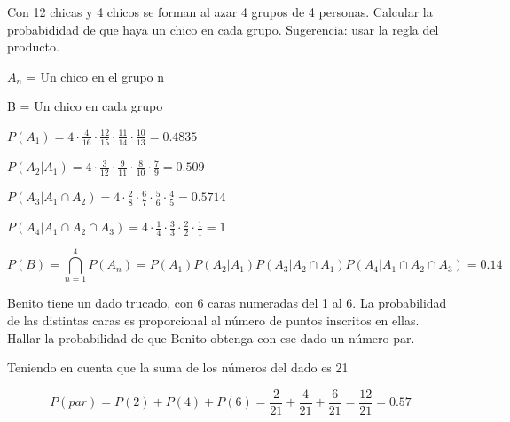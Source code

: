 \begin{problem}[6]Con 12 chicas y 4 chicos se forman al azar 4 grupos de 4 personas.
Calcular la probabididad de que haya un chico en cada grupo. Sugerencia:
usar la regla del producto.
 
\solution

\begin{expla}

$A_n$ = Un chico en el grupo n

B = Un chico en cada grupo
\end{expla}

$P(A_1)=4\cdot\frac{4}{16}\cdot\frac{12}{15}\cdot\frac{11}{14}\cdot\frac{10}{13}=0.4835$

$P(A_2|A_1)=4\cdot\frac{3}{12}\cdot\frac{9}{11}\cdot\frac{8}{10}\cdot\frac{7}{9}=0.509$

$P(A_3|A_1\cap A_2)=4\cdot\frac{2}{8}\cdot\frac{6}{7}\cdot\frac{5}{6}\cdot\frac{4}{5}=0.5714$

$P(A_4|A_1\cap A_2\cap A_3)=4\cdot\frac{1}{4}\cdot\frac{3}{3}\cdot\frac{2}{2}\cdot\frac{1}{1}=1$


\[
P(B)=\bigcap_{n=1}^4P(A_n)=P(A_1)P(A_2|A_1)P(A_3|A_2\cap A_1)P(A_4|A_1\cap A_2\cap A_3)=0.14
\]




\end{problem}


\begin{problem}[7]Benito tiene un dado  trucado, con 6 caras  numeradas del 1 al 6. 
La probabilidad de las
distintas caras es proporcional al n\'umero de puntos inscritos en
ellas. Hallar la probabilidad de que Benito obtenga con ese dado un n\'umero
par.
\solution

\begin{expla}

Teniendo en cuenta que la suma de los números del dado es 21

\end{expla}

\[
P(par)=P(2)+P(4)+P(6)=\frac{2}{21}+\frac{4}{21}+\frac{6}{21}=\frac{12}{21}=0.57
\]

\end{problem}


